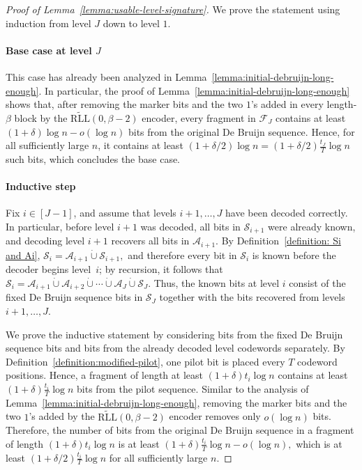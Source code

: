 \documentclass[journal,letterpaper,onecolumn,11pt]{IEEEtran}
\newcommand{\cA}{\mathcal{A}}
\newcommand{\cF}{\mathcal{F}}
\newcommand{\cS}{\mathcal{S}}
\begin{document}
\begin{proof}[Proof of Lemma~\ref{lemma:usable-level-signature}]
We prove the statement using induction from level \(J\) down to level \(1\).

 \paragraph*{Base case at level \(J\)} 
This case has already been analyzed in Lemma~\ref{lemma:initial-debruijn-long-enough}.  
In particular, the proof of Lemma~\ref{lemma:initial-debruijn-long-enough} shows that, after removing the marker bits and the two \(1\)'s added in every length-\(\beta\) block by the
\(\widetilde{\mathrm{RLL}}(0,\beta-2)\) encoder, every fragment in
\(\cF_J\) contains at least
$(1+\delta)\log n-o(\log n)$ bits from the original De Bruijn sequence. 
Hence, for all sufficiently large \(n\), it contains at least
$(1+\delta/2)\log n=(1+\delta/2)\frac{t_J}{T}\log n$ such bits, which concludes the base case.  

\paragraph*{Inductive step}
Fix \(i\in[J-1]\), and assume that levels \(i+1,\ldots,J\) have been
decoded correctly.  
In particular, before level \(i+1\) was decoded, all
bits in \(\cS_{i+1}\) were already known, and decoding level \(i+1\)
recovers all bits in \(\cA_{i+1}\). 
By Definition~\ref{definition: Si and Ai},
$\cS_i=\cA_{i+1}\mathbin{\dot\cup}\cS_{i+1},$
and therefore every bit in \(\cS_i\) is known before the decoder begins level~\(i\);  
by recursion, it follows that
$\cS_i=\cA_{i+1}\mathbin{\dot\cup}\cA_{i+2}\mathbin{\dot\cup}\cdots\mathbin{\dot\cup}\cA_J\mathbin{\dot\cup}\cS_J$.
Thus, the known bits at level \(i\) consist of the fixed De Bruijn sequence bits in \(\cS_J\) together with the bits recovered from levels \(i+1,\ldots,J\).

We prove the inductive statement by considering bits from the fixed De Bruijn sequence bits and bits from the already decoded level codewords separately. 
By Definition~\ref{definition:modified-pilot}, one pilot bit is placed every \(T\) codeword positions.  
Hence, a fragment of length at least
\((1+\delta)t_i\log n\) contains at least $(1+\delta)\frac{t_i}{T}\log n$ bits from the pilot sequence.  
Similar to the analysis of Lemma~\ref{lemma:initial-debruijn-long-enough}, removing the marker bits and the two \(1\)'s added by the
\(\widetilde{\mathrm{RLL}}(0,\beta-2)\) encoder removes only
\(o(\log n)\) bits.  
Therefore, the number of bits from the original
De Bruijn sequence in a fragment of length \((1+\delta)t_i\log n\) is at least $(1+\delta)\frac{t_i}{T}\log n-o(\log n),$ which is at least $(1+\delta/2)\frac{t_i}{T}\log n$ for all sufficiently large \(n\).


\end{proof}
\end{document}

